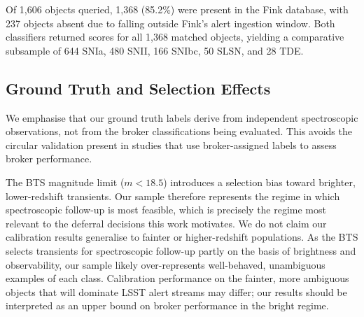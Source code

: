 Of 1,606 objects queried, 1,368 (85.2\%) were present in the Fink 
database, with 237 objects absent due to falling outside Fink's alert 
ingestion window. Both classifiers returned scores for all 1,368 matched 
objects, yielding a comparative subsample of 644 SNIa, 480 SNII, 
166 SNIbc, 50 SLSN, and 28 TDE.

\subsection{Ground Truth and Selection Effects}
\label{sec:data:groundtruth}

We emphasise that our ground truth labels derive from independent 
spectroscopic observations, not from the broker classifications being 
evaluated. This avoids the circular validation present in studies that 
use broker-assigned labels to assess broker performance.

The BTS magnitude limit ($m < 18.5$) introduces a selection bias toward 
brighter, lower-redshift transients. Our sample therefore represents 
the regime in which spectroscopic follow-up is most feasible, which is 
precisely the regime most relevant to the deferral decisions this work 
motivates. We do not claim our calibration results generalise to 
fainter or higher-redshift populations. As the BTS selects transients 
for spectroscopic follow-up partly on the basis of brightness and 
observability, our sample likely over-represents well-behaved, 
unambiguous examples of each class. Calibration performance on the 
fainter, more ambiguous objects that will dominate LSST alert streams 
may differ; our results should be interpreted as an upper bound on 
broker performance in the bright regime.